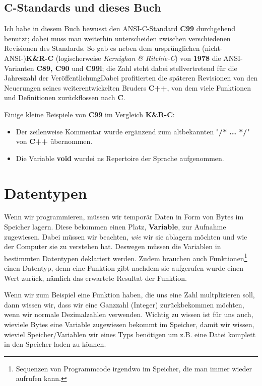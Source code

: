\documentclass[a4paper,10pt,dvips,fleqn,titlepage,twoside]{book}
\begin{document}
\subsection{C-Standards und dieses Buch}
Ich habe in diesem Buch bewusst den ANSI-C-Standard \textbf{C99} durchgehend benutzt; dabei muss man weiterhin unterscheiden zwischen verschiedenen Revisionen des Standards. So gab es neben dem ursprünglichen (nicht-ANSI-)\textbf{K\&R-C} (logischerweise \emph{Kernighan \& Ritchie-C}) von \textbf{1978} die ANSI-Varianten \textbf{C89, C90} und \textbf{C99l}; die Zahl steht dabei stellvertretend für die Jahreszahl der Veröffentlichung\newline Dabei profitierten die späteren Revisionen von den Neuerungen seines weiterentwickelten Bruders \textbf{C++}, von dem viele Funktionen und Definitionen zurückflossen nach \textbf{C}.

Einige kleine Beispiele von \textbf{C99} im Vergleich \textbf{K\&R-C}:

\begin{itemize}
 \item Der zeilenweise Kommentar wurde ergänzend zum altbekannten "\textbf{/* ... */}" von \textbf{C++} übernommen.
\item Die Variable \textbf{void} wurdei ns Repertoire der Sprache aufgenommen.
\end{itemize}

\section{Datentypen}
Wenn wir programmieren, müssen wir temporär Daten in Form von Bytes im Speicher lagern. Diese bekommen einen Platz, \textbf{Variable}, zur Aufnahme zugewiesen. Dabei müssen wir beachten, \emph{wie} wir sie ablagern möchten und wie der Computer sie zu verstehen hat. Deswegen müssen die Variablen in bestimmten Datentypen deklariert werden. Zudem brauchen auch Funktionen\footnote{Sequenzen von Programmcode irgendwo im Speicher, die man immer wieder aufrufen kann.} einen Datentyp, denn eine Funktion gibt nachdem sie aufgerufen wurde einen Wert zurück, nämlich das erwartete Resultat der Funktion.

Wenn wir zum Beispiel eine Funktion haben, die uns eine Zahl multplizieren soll, dann wissen wir, dass wir eine Ganzzahl (Integer) zurückbekommen möchten, wenn wir normale Dezimalzahlen verwenden. Wichtig zu wissen ist für uns auch, wieviele Bytes eine Variable zugewiesen bekommt im Speicher, damit wir wissen, wieviel Speicher/Variablen wir eines Typs benötigen um z.B. eine Datei komplett in den Speicher laden zu können.
\end{document}
